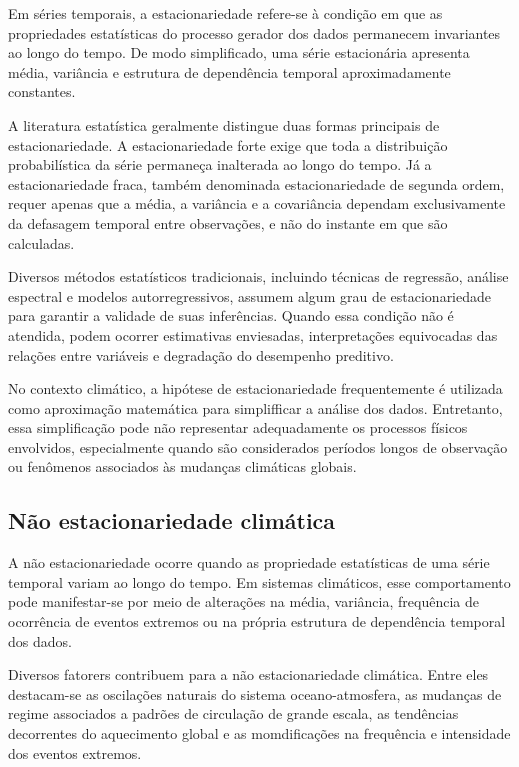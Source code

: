 	Em séries temporais, a estacionariedade refere-se à condição em que as propriedades estatísticas do processo gerador dos dados permanecem invariantes ao longo do tempo.
	De modo simplificado, uma série estacionária apresenta média, variância e estrutura de dependência temporal aproximadamente constantes.

	A literatura estatística geralmente distingue duas formas principais de estacionariedade.
	A estacionariedade forte exige que toda a distribuição probabilística da série permaneça inalterada ao longo do tempo.
	Já a estacionariedade fraca, também denominada estacionariedade de segunda ordem, requer apenas que a média, a variância e a covariância dependam exclusivamente da defasagem temporal entre observações, e não do instante em que são calculadas.

	Diversos métodos estatísticos tradicionais, incluindo técnicas de regressão, análise espectral e modelos autorregressivos, assumem algum grau de estacionariedade para garantir a validade de suas inferências.
	Quando essa condição não é atendida, podem ocorrer estimativas enviesadas, interpretações equivocadas das relações entre variáveis e degradação do desempenho preditivo.

	No contexto climático, a hipótese de estacionariedade frequentemente é utilizada como aproximação matemática para simplifficar a análise dos dados.
	Entretanto, essa simplificação pode não representar adequadamente os processos físicos envolvidos, especialmente quando são considerados períodos longos de observação ou fenômenos associados às mudanças climáticas globais.


\subsection{Não estacionariedade climática}\label{sec:nao-estacionariedade-climatica}
	
	A não estacionariedade ocorre quando as propriedade estatísticas de uma série temporal variam ao longo do tempo.
	Em sistemas climáticos, esse comportamento pode manifestar-se por meio de alterações na média, variância, frequência de ocorrência de eventos extremos ou na própria estrutura de dependência temporal dos dados.

	Diversos fatorers contribuem para a não estacionariedade climática. Entre eles destacam-se as oscilações naturais do sistema oceano-atmosfera, as mudanças de regime associados a padrões de circulação de grande escala, as tendências decorrentes do aquecimento global e as momdificações na frequência e intensidade dos eventos extremos.

